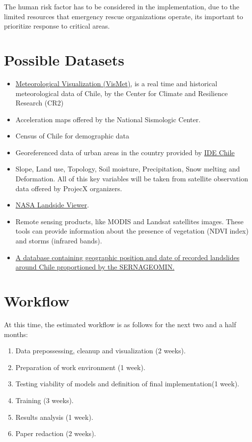 \documentclass[sigconf, nonacm]{acmart}
\begin{document}
The human risk factor has to be considered in the implementation, due to the limited resources that emergency rescue organizations operate, its important to prioritize response to critical areas. 

\section{Possible Datasets}
\begin{itemize}
    \item \href{http://vismet.cr2.cl/}{Meteorological Visualization (VisMet)}, is a real time and historical meteorological data of Chile, by the Center for Climate and Resilience Research (CR2)
    \item Acceleration maps offered by the National Sismologic Center.
    \item Census of Chile for demographic data
    \item Georeferenced data of urban areas in the country provided by \href {http://www.ide.cl/}{IDE Chile}
    \item Slope, Land use, Topology, Soil moisture, Precipitation, Snow melting and Deformation. All of this key variables will be taken from satellite observation data offered by ProjecX organizers.
    \item \href{https://maps.nccs.nasa.gov/arcgis/apps/webappviewer/index.html?id=824ea5864ec8423fb985b33ee6bc05b7}{NASA Landside Viewer}.
    \item Remote sensing products, like MODIS and Landsat satellites images. These tools can provide information about the presence of vegetation (NDVI index) and storms (infrared bands).
    \item \href{https://portalgeominbeta.sernageomin.cl/}{A database containing geographic position and date of recorded landslides around Chile proportioned by the SERNAGEOMIN.}
\end{itemize}

\section{Workflow}

At this time, the estimated workflow is as follows for the next two and a half months: 

\begin{enumerate}
    \item Data prepossessing, cleanup and visualization (2 weeks).
    \item Preparation of work environment (1 week).
    \item Testing viability of models and definition of final implementation(1 week). 
    \item Training (3 weeks).
    \item Results analysis (1 week).
    \item Paper redaction (2 weeks).
\end{enumerate}




\end{document}
